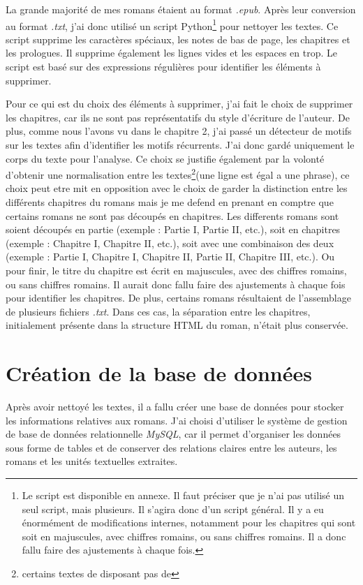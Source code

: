 La grande majorité de mes romans étaient au format \textsl{.epub}. Après leur conversion au format \textsl{.txt}, j'ai donc utilisé un script Python\footnote{Le script est disponible en annexe. Il faut préciser que je n'ai pas utilisé un seul script, mais plusieurs. Il s'agira donc d'un script général. Il y a eu énormément de modifications internes, notamment pour les chapitres qui sont soit en majuscules, avec chiffres romains, ou sans chiffres romains. Il a donc fallu faire des ajustements à chaque fois.} pour nettoyer les textes. Ce script supprime les caractères spéciaux, les notes de bas de page, les chapitres et les prologues. Il supprime également les lignes vides et les espaces en trop. Le script est basé sur des expressions régulières pour identifier les éléments à supprimer.

Pour ce qui est du choix des éléments à supprimer, j'ai fait le choix de supprimer les chapitres, car ils ne sont pas représentatifs du style d'écriture de l'auteur. De plus, comme nous l'avons vu dans le chapitre 2, j'ai passé un détecteur de motifs sur les textes afin d'identifier les motifs récurrents. J'ai donc gardé uniquement le corps du texte pour l'analyse. Ce choix se justifie également par la volonté d'obtenir une normalisation entre les textes\footnote{certains textes de disposant pas de }(une ligne est égal a une phrase), ce choix peut etre mit en opposition avec le choix de garder la distinction entre les différents chapitres du romans mais je me defend en prenant en comptre que certains romans ne sont pas découpés en chapitres. Les differents romans sont soient découpés en partie (exemple : Partie I, Partie II, etc.), soit en chapitres (exemple : Chapitre I, Chapitre II, etc.), soit avec une combinaison des deux (exemple : Partie I, Chapitre I, Chapitre II, Partie II, Chapitre III, etc.). Ou pour finir, le titre du chapitre est écrit en majuscules, avec des chiffres romains, ou sans chiffres romains. Il aurait donc fallu faire des ajustements à chaque fois pour identifier les chapitres. De plus, certains romans résultaient de l'assemblage de plusieurs fichiers \textsl{.txt}. Dans ces cas, la séparation entre les chapitres, initialement présente dans la structure HTML du roman, n'était plus conservée.

\section{Création de la base de données}

Après avoir nettoyé les textes, il a fallu créer une base de données pour stocker les informations relatives aux romans. J'ai choisi d'utiliser le système de gestion de base de données relationnelle \textsl{MySQL}, car il permet d'organiser les données sous forme de tables et de conserver des relations claires entre les auteurs, les romans et les unités textuelles extraites.

